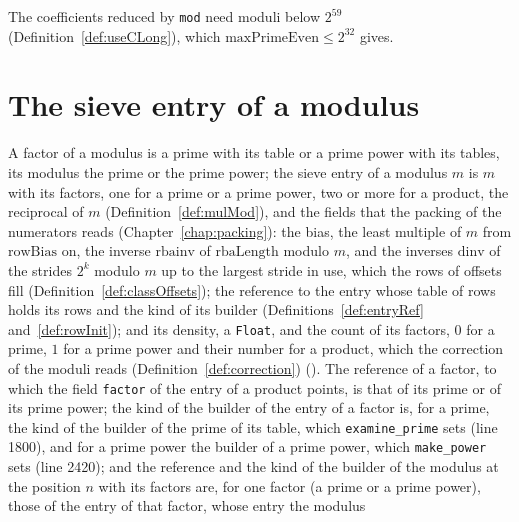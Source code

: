 The coefficients reduced by \verb|mod| need moduli below $2^{59}$ (Definition~\ref{def:useCLong}),
which $\mathrm{maxPrimeEven} \le 2^{32}$ gives.

\section{The sieve entry of a modulus}\label{sec:sieveEntry}

\begin{definition}\label{def:SieveEntry}
  \leanok
  A factor of a modulus is a prime with its table or a prime power with its tables, its modulus the
  prime or the prime power; the sieve entry of a modulus $m$ is $m$ with its factors, one for a
  prime or a prime power, two or more for a product, the reciprocal of $m$
  (Definition~\ref{def:mulMod}), and the fields that the packing of the numerators reads
  (Chapter~\ref{chap:packing}): the bias, the least multiple of $m$ from $\mathrm{rowBias}$ on, the
  inverse $\mathrm{rbainv}$ of $\mathrm{rbaLength}$ modulo $m$, and the inverses $\mathrm{dinv}$ of
  the strides $2^k$ modulo $m$ up to the largest stride in use, which the rows of offsets fill
  (Definition~\ref{def:classOffsets}); the reference to the entry whose table of rows holds its rows
  and the kind of its builder (Definitions~\ref{def:entryRef} and~\ref{def:rowInit}); and its
  density, a \verb|Float|, and the count of its factors, $0$ for a prime, $1$ for a prime power and
  their number for a product, which the correction of the moduli reads
  (Definition~\ref{def:correction}) (). The reference of a factor,
  to which the field \verb|factor| of the entry of a product points, is that of its prime or of its
  prime power; the kind of the builder of the entry of a factor is, for a prime, the kind of the
  builder of the prime of its table, which \verb|examine_prime| sets (line 1800), and for a prime
  power the builder of a prime power, which \verb|make_power| sets (line 2420); and the reference
  and the kind of the builder of the modulus at the position $n$ with its factors are, for one
  factor (a prime or a prime power), those of the entry of that factor, whose entry the modulus

\end{definition}
